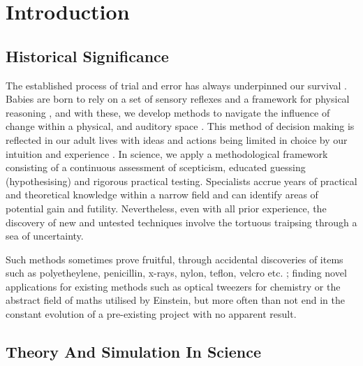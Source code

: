 
\section{Introduction}

\subsection{Historical Significance}
The established process of trial and error has always underpinned our survival \citep{TrialandError}. Babies are born to rely on a set of sensory reflexes and a framework for physical reasoning \citep{pr}, and with these, we develop methods to navigate the influence of change within a physical, and auditory space \citep{objects}. This method of decision making is reflected in our adult lives with ideas and actions being limited in choice by our intuition and experience \citep{descartes}. In science, we apply a methodological framework consisting of a continuous assessment of scepticism, educated guessing (hypothesising) and rigorous practical testing. Specialists accrue years of practical and theoretical knowledge within a narrow field and can identify areas of potential gain and futility. Nevertheless, even with all prior experience, the discovery of new and untested techniques involve the tortuous traipsing through a sea of uncertainty.

 Such methods sometimes prove fruitful, through accidental discoveries of items such as polyetheylene, penicillin, x-rays, nylon, teflon, velcro etc.   \citep{accidental}; finding novel applications for existing methods such as optical tweezers for chemistry or the abstract field of maths utilised by Einstein, but more often than not end in the constant evolution of a pre-existing project with no apparent result.

\subsection{Theory And Simulation In Science}


